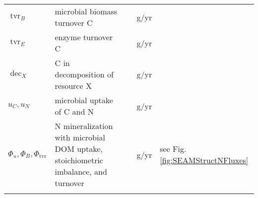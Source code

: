 \begin{table}[t]
\begin{tabular}{lp{6cm}llp{5.5cm}}
$\operatorname{tvr}_B $ & microbial biomass turnover C &  & g/yr & \\
$\operatorname{tvr}_E $ & enzyme turnover C &   & g/yr & \\
$\operatorname{dec}_X $ & C in decomposition of resource X & & g/yr & \\
$u_C,u_N$ & microbial uptake of C and N  & & g/yr & \\
$\Phi_u, \Phi_B, \Phi_{\operatorname{tvr}}$ & N mineralization with microbial
DOM uptake, stoichiometric imbalance, and turnover & & g/yr & see Fig.
\ref{fig:SEAMStructNFluxes}
\\
\bottomhline
\end{tabular}
\end{table}


